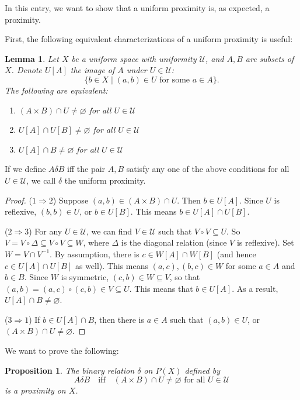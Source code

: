 \documentclass[12pt]{article}
\newtheorem{prop}{Proposition}
\newtheorem{lem}{Lemma}
\begin{document}
In this entry, we want to show that a uniform proximity is, as expected, a proximity.

First, the following equivalent characterizations of a uniform proximity is useful:

\begin{lem} Let $X$ be a uniform space with uniformity $\mathcal{U}$, and $A,B$ are subsets of $X$.  Denote $U[A]$ the image of $A$ under $U\in \mathcal{U}$: $$\lbrace b\in X\mid (a,b)\in U \mbox{ for some } a \in A\rbrace.$$  The following are equivalent:
\begin{enumerate}
\item $(A\times B)\cap U\ne \varnothing$ for all $U\in \mathcal{U}$
\item $U[A]\cap U[B]\ne \varnothing$ for all $U\in \mathcal{U}$
\item $U[A]\cap B\ne \varnothing$ for all $U\in \mathcal{U}$
\end{enumerate}
\end{lem}

If we define $A\delta B$ iff the pair $A,B$ satisfy any one of the above conditions for all $U\in \mathcal{U}$, we call $\delta$ the uniform proximity.

\begin{proof}
($1\Rightarrow 2$) Suppose $(a,b)\in (A\times B)\cap U$.  Then $b\in U[A]$.  Since $U$ is reflexive, $(b,b)\in U$, or $b\in U[B]$.  This means $b\in U[A]\cap U[B]$.

($2\Rightarrow 3$) For any $U\in \mathcal{U}$, we can find $V\in \mathcal{U}$ such that $V\circ V\subseteq U$.  So $V = V\circ \Delta \subseteq V\circ V\subseteq W$, where $\Delta$ is the diagonal relation (since $V$ is reflexive).  Set $W=V\cap V^{-1}$.  By assumption, there is $c\in W[A]\cap W[B]$ (and hence $c\in U[A]\cap U[B]$ as well).  This means $(a,c), (b,c)\in W$ for some $a \in A$ and $b\in B$.  Since $W$ is symmetric, $(c,b)\in W\subseteq V$, so that $(a,b)=(a,c)\circ (c,b)\in V\subseteq U$.  This means that $b\in U[A]$.  As a result, $U[A]\cap B\ne \varnothing$.

($3\Rightarrow 1$) If $b\in U[A]\cap B$, then there is $a\in A$ such that $(a,b)\in U$, or $(A\times B)\cap U\ne \varnothing$.
\end{proof}

We want to prove the following:

\begin{prop}  The binary relation $\delta$ on $P(X)$ defined by $$A\delta B\quad\mbox{iff}\quad (A\times B)\cap U\ne \varnothing \mbox{ for all }U\in \mathcal{U}$$ is a proximity on $X$.
\end{prop}
\end{document}
